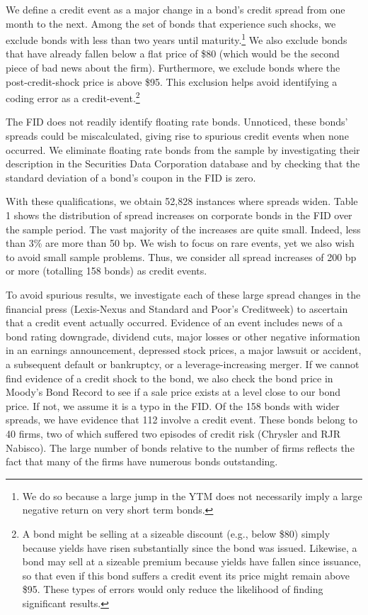 \documentclass[titlepage,11pt]{article}
\begin{document}
We define a credit event as a major change in a bond's credit
spread from one month to the next. Among the set of bonds that experience such
shocks,
we exclude bonds with less than two years until
maturity.\footnote{We do so because a large jump in the YTM does not
necessarily imply a large negative return on very short term bonds.}
We also exclude bonds that have already
fallen below a flat price of \$80 (which would be the second piece
of bad news about the firm). Furthermore, we exclude bonds where the
post-credit-shock price is above \$95. This exclusion
helps avoid identifying a coding error as a
credit-event.\footnote{A bond might be selling at a sizeable discount (e.g.,
below \$80) simply because
yields have risen substantially since the bond was issued. Likewise,
a bond may sell at a sizeable premium because yields have fallen since
issuance,
so that even if this bond suffers a credit event its
price might remain above \$95.  These
types of errors would only reduce the likelihood of finding significant
results.}

The FID does not readily identify floating rate bonds. Unnoticed,
these bonds' spreads could be miscalculated, giving rise to spurious
credit events when none occurred. We eliminate floating rate bonds
from the sample by investigating their description in the Securities
Data Corporation database and by checking that the standard
deviation of a bond's coupon in the FID is zero.

With these qualifications, we obtain 52,828 instances where spreads
widen. Table 1 shows the distribution of spread increases
on corporate bonds in the FID over the sample period. The vast majority of the
increases are
quite small. Indeed, less than 3\% are more than 50 bp. We wish to focus on
rare events, yet
we also wish to avoid small sample problems.
Thus, we consider all spread increases of 200 bp or more (totalling 158 bonds)
as credit events.

To avoid spurious results, we investigate each of these large spread
changes in the financial press (Lexis-Nexus and
Standard and Poor's Creditweek) to ascertain that a credit event
actually occurred.  Evidence of an event includes news of a bond rating
downgrade, dividend
cuts, major losses or other negative information in an earnings
announcement, depressed stock prices, a major lawsuit or accident, a
subsequent default or bankruptcy, or a leverage-increasing merger.
If we cannot find evidence of a credit shock to the bond, we also
check the bond price in Moody's Bond Record to see if a
sale price exists at a level close to our bond price. If not, we assume it
is a typo in the FID. Of the 158 bonds with wider spreads, we have evidence
that 112
involve a credit event. These bonds belong to 40 firms, two of
which suffered two episodes of credit risk (Chrysler and RJR
Nabisco). The large number of bonds relative to the number of firms
reflects the fact that many of the firms have numerous bonds
outstanding.
\end{document}
